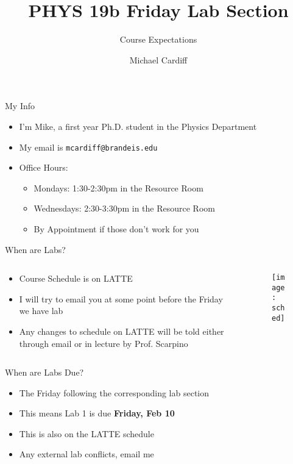\documentclass{beamer}
\title{PHYS 19b Friday Lab Section}
\author{Michael Cardiff}
\subtitle{Course Expectations}
\begin{document}
\begin{frame}
  \titlepage
\end{frame}

\begin{frame}{My Info}
  \begin{itemize}
  \item I'm Mike, a first year Ph.D. student in the Physics Department
  \item My email is \texttt{mcardiff@brandeis.edu}
  \item Office Hours:
    \begin{itemize}
    \item Mondays: 1:30-2:30pm in the Resource Room
    \item Wednesdays: 2:30-3:30pm in the Resource Room
    \item By Appointment if those don't work for you
    \end{itemize}
  \end{itemize}
\end{frame}

\begin{frame}{When are Labs?}
  \begin{columns}
    \begin{column}{0.5\textwidth}
      \begin{itemize}
      \item Course Schedule is on LATTE
      \item I will try to email you at some point before the Friday we have lab
      \item Any changes to schedule on LATTE will be told either through email or in lecture by Prof. Scarpino
      \end{itemize}
    \end{column}
    \begin{column}{0.5\textwidth}
      \begin{figure}[H]
        \centering
        \texttt{[image: sched]}
      \end{figure}
    \end{column}
  \end{columns}
\end{frame}

\begin{frame}{When are Labs Due?}
  \begin{itemize}
  \item The Friday following the corresponding lab section
  \item This means Lab 1 is due \textbf{Friday, Feb 10}
  \item This is also on the LATTE schedule
  \item Any external lab conflicts, email me
  \end{itemize}
\end{frame}
\end{document}
